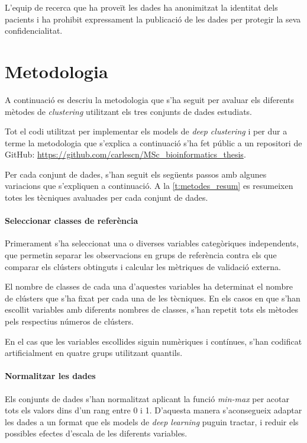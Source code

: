 \documentclass[CAT,BIB]{TFUOC}%
\begin{document}
        L'equip de recerca que ha proveït les dades
        ha anonimitzat la identitat dels pacients
        i ha prohibit expressament la publicació de les dades
        per protegir la seva confidencialitat.



    \section{Metodologia}
    \label{s:metodologia}

    A continuació es descriu la metodologia que s'ha seguit
    per avaluar els diferents mètodes de \textit{clustering}
    utilitzant els tres conjunts de dades estudiats.

    Tot el codi utilitzat per implementar els models de \textit{deep clustering}
    i per dur a terme la metodologia que s'explica a continuació
    s'ha fet públic a un repositori de GitHub:
    \url{https://github.com/carlescn/MSc_bioinformatics_thesis}.

    Per cada conjunt de dades,
    s'han seguit els següents passos
    amb algunes variacions que s'expliquen a continuació.
    A la \cref{t:metodes_resum} es resumeixen totes les tècniques
    avaluades per cada conjunt de dades.

    \paragraph{Seleccionar classes de referència}
        Primerament s'ha seleccionat una o diverses variables categòriques independents,
        que permetin separar les observacions en grups de referència
        contra els que comparar els clústers obtinguts
        i calcular les mètriques de validació externa.

        El nombre de classes de cada una d'aquestes variables
        ha determinat el nombre de clústers que s'ha fixat per cada una de les tècniques.
        En els casos en que s'han escollit variables amb diferents nombres de classes,
        s'han repetit tots els mètodes pels respectius números de clústers.

        En el cas que les variables escollides siguin numèriques i contínues,
        s'han codificat artificialment en quatre grups utilitzant quantils.

    \paragraph{Normalitzar les dades}
        Els conjunts de dades s'han normalitzat
        aplicant la funció \textit{min-max}
        per acotar tots els valors dins d'un rang entre 0 i 1.
        D'aquesta manera s'aconsegueix
        adaptar les dades a un format que els models de \textit{deep learning} puguin tractar,
        i reduir els possibles efectes d'escala de les diferents variables.
\end{document}

